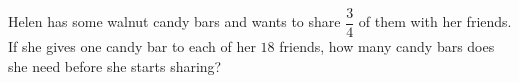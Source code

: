Helen has some walnut candy bars and wants to share $\dfrac{3}{4}$ of them with her friends. If she gives one candy bar to each of her $18$ friends, how many candy bars does she need before she starts sharing?
